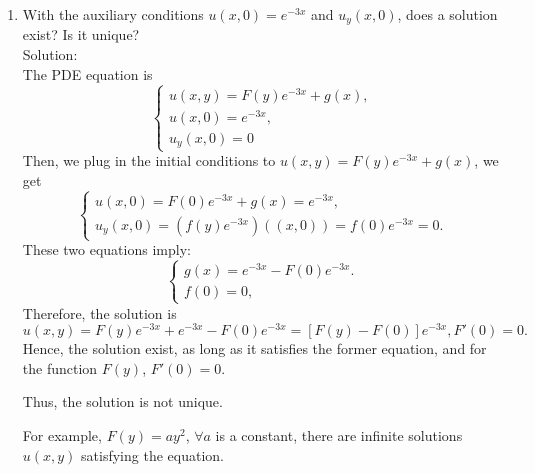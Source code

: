 \documentclass[12pt]{article}%
\begin{document}
\begin{enumerate}
\begin{enumerate}
\begin{enumerate}
            \item With the auxiliary conditions $u\left(x,0\right) = e^{-3x}$ and $u_y\left(x,0\right)$, does a solution exist? Is it unique? \smallskip \\
            Solution:\\
            The PDE equation is 
            \begin{equation*}
                \begin{cases}
                    u(x,y)=F(y)e^{-3x}+g(x),
                    \\
                    u(x,0)=e^{-3x},
                    \\
                    u_{y}(x,0)=0
                \end{cases}
            \end{equation*}
            Then, we plug in the initial conditions to $u(x,y)=F(y)e^{-3x}+g(x)$, we get
            \begin{equation*}
                \begin{cases}
                    u(x,0)=F(0)e^{-3x}+g(x)=e^{-3x},
                    \\
                    u_{y}(x,0)=(f(y)e^{-3x})((x,0))=f(0)e^{-3x}=0.
                \end{cases}
            \end{equation*}
            These two equations imply:
            \begin{equation*}
                \begin{cases}
                    g(x)=e^{-3x}-F(0)e^{-3x}.
                    \\
                    f(0)=0,
                \end{cases}
            \end{equation*}
            Therefore, the solution is 
           \[u(x,y)=F(y)e^{-3x}+e^{-3x}-F(0)e^{-3x}=[F(y)-F(0)]e^{-3x}, F'(0)=0.\]
           Hence, the solution exist, as long as it satisfies the former
           equation, and for the function $F(y)$, $F'(0)=0$.
           
           Thus, the solution is not unique. 
           
           For example, $F(y)=ay^2$, $\forall a $ is a constant, there are infinite solutions $u(x,y)$ satisfying the equation.

            
        \end{enumerate}
    \end{enumerate}


\end{enumerate}
\end{document}
